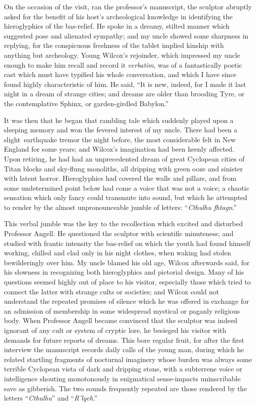 On the occasion of the visit, ran the professor's manuscript, the
sculptor abruptly asked for the benefit of his host's archeological
knowledge in identifying the hieroglyphics of the bas-relief. He spoke
in a dreamy, stilted manner which suggested pose and alienated sympathy;
and my uncle showed some sharpness in replying, for the conspicuous
freshness of the tablet implied kinship with anything but archeology.
Young Wilcox's rejoinder, which impressed my uncle enough to make him
recall and record it \emph{verbatim}, was of a fantastically poetic cast which
must have typified his whole conversation, and which I have since found
highly characteristic of him. He said, ``It is new, indeed, for I made
it last night in a dream of strange cities; and dreams are older than
brooding Tyre, or the contemplative Sphinx, or garden-girdled Babylon.''

It was then that he began that rambling tale which suddenly played upon
a sleeping memory and won the fevered interest of my uncle. There had been a slight\est\ earthquake tremor the night before, the most considerable
felt in New England for some years; and Wilcox's imagination had been
keenly affected. Upon retiring, he had had an unprecedented dream of
great Cyclopean cities of Titan blocks and sky-flung monoliths, all
dripping with green ooze
and sinister with latent horror. Hieroglyphics
had covered the walls and pillars, and from some undetermined point
below had come a voice that was not a voice; a chaotic sensation which
only fancy could transmute into sound, but which he attempted to render
by the almost unpronounceable jumble of letters: ``\emph{Cthulhu fhtagn}.''

This verbal jumble was the key to the recollection which excited and
disturbed Professor Angell. He questioned the sculptor with scientific
minuteness; and studied with frantic intensity the bas-relief on which
the youth had found himself working, chilled and clad only in his night
clothes, when waking had stolen bewilderingly over him. My uncle blamed
his old age, Wilcox afterwards said, for his slowness in recognizing
both hieroglyphics and pictorial design. Many of his questions seemed
highly out of place to his visitor, especially those which tried to
connect the latter with strange cults or societies; and Wilcox could not
understand the repeated promises of silence which he was offered in
exchange for an admission of membership in some widespread mystical or
paganly religious body. When Professor Angell became convinced that the
sculptor was indeed ignorant of any cult or system of cryptic lore, he
besieged his visitor with demands for future reports of dreams. This
bore regular fruit, for after the first interview the manuscript records
daily calls of the young man, during which he related startling
fragments of nocturnal imaginery whose burden was always some terrible
Cyclopean vista of dark and dripping stone, with a subterrene voice or
intelligence shouting monotonously in enigmatical sense-impacts
uninscribable save as gibberish. The two sounds frequently repeated are
those rendered by the letters ``\emph{Cthulhu}'' and ``\emph{R'lyeh}.''

